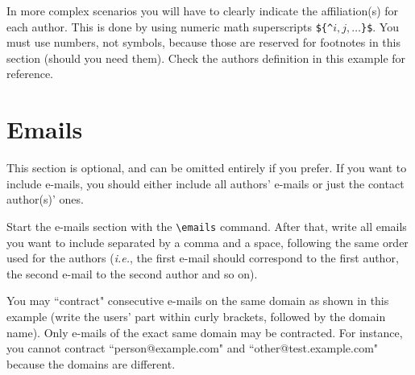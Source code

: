 \documentclass{article}
\begin{document}
In more complex scenarios you will have to clearly indicate the affiliation(s) for each author. This is done by using numeric math superscripts {\tt \$\{\^{}$i,j, \ldots$\}\$}. You must use numbers, not symbols, because those are reserved for footnotes in this section (should you need them). Check the authors definition in this example for reference.

\section{Emails}

This section is optional, and can be omitted entirely if you prefer. If you want to include e-mails, you should either include all authors' e-mails or just the contact author(s)' ones.

Start the e-mails section with the {\tt \textbackslash{}emails} command. After that, write all emails you want to include separated by a comma and a space, following the same order used for the authors (\emph{i.e.}, the first e-mail should correspond to the first author, the second e-mail to the second author and so on).

You may ``contract" consecutive e-mails on the same domain as shown in this example (write the users' part within curly brackets, followed by the domain name). Only e-mails of the exact same domain may be contracted. For instance, you cannot contract ``person@example.com" and ``other@test.example.com" because the domains are different.
\end{document}
